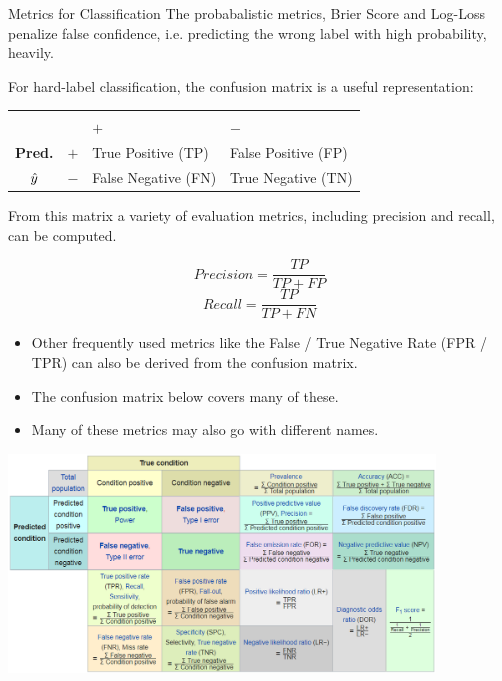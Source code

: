 \documentclass[11pt,compress,t,notes=noshow, xcolor=table]{beamer}
\begin{document}
\begin{vbframe}{Metrics for Classification}
The probabalistic metrics, Brier Score and Log-Loss penalize false confidence, i.e. predicting the wrong label with high probability, heavily.

\framebreak

For hard-label classification, the confusion matrix is a useful representation:

\begin{center}
\small
\begin{tabular}{cc|>{\centering\arraybackslash}p{7em}>{\centering\arraybackslash}p{8em}}
    & & \multicolumn{2}{c}{\bfseries True Class $y$} \\
    & & $+$ & $-$ \\
    \hline
    \bfseries Pred.     & $+$ & True Positive (TP)  & False Positive (FP) \\
              $\hat{y}$ & $-$ & False Negative (FN) & True Negative (TN) \\
\end{tabular}
\end{center}

From this matrix a variety of evaluation metrics, including precision and recall, can be computed.

$$ Precision = \frac{TP}{TP + FP}$$
$$Recall = \frac{TP}{TP + FN} $$

\framebreak

\begin{itemize}
\item Other frequently used metrics like the False / True Negative Rate (FPR / TPR) can also be derived from the confusion matrix.
\item The confusion matrix below covers many of these.
\item Many of these metrics may also go with different names.
\end{itemize}

\begin{center}
\includegraphics[width=0.85\textwidth]{figure_man/roc-confmatrix-allterms.png}
\end{center}

\href{https://en.wikipedia.org/wiki/F1_score#Diagnostic_testing}{} $\phantom{blablabla}$
\href{https://upload.wikimedia.org/wikipedia/commons/0/0e/DiagnosticTesting_Diagram.svg}{}


\end{vbframe}
\end{document}
